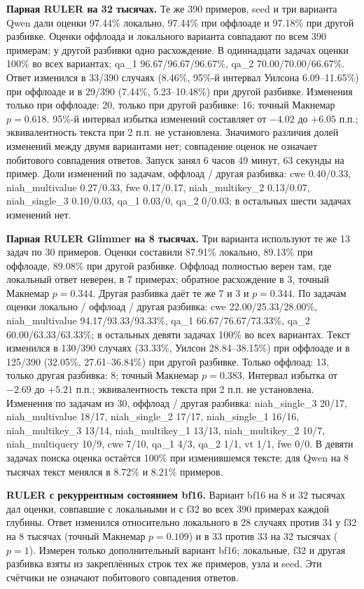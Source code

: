 \textbf{Парная RULER на 32 тысячах.} Те же 390 примеров, seed и три варианта Qwen дали оценки
97.44\% локально, 97.44\% при оффлоаде и 97.18\% при другой разбивке.
Оценки оффлоада и локального варианта совпадают по всем 390 примерам; у другой разбивки одно расхождение.
В одиннадцати задачах оценки 100\% во всех вариантах; qa\_1 96.67/96.67/96.67\%, qa\_2 70.00/70.00/66.67\%.
Ответ изменился в 33/390 случаях (8.46\%, 95\%-й интервал Уилсона 6.09--11.65\%) при оффлоаде
и в 29/390 (7.44\%, 5.23--10.48\%) при другой разбивке. Изменения только при оффлоаде: 20,
только при другой разбивке: 16; точный Макнемар $p=0.618$.
95\%-й интервал избытка изменений составляет от $-4.02$ до $+6.05$ п.п.; эквивалентность текста при 2 п.п. не установлена.
Значимого различия долей изменений между двумя вариантами нет; совпадение оценок не означает побитового совпадения ответов.
Запуск занял 6 часов 49 минут, 63 секунды на пример.
Доли изменений по задачам, оффлоад / другая разбивка: cwe 0.40/0.33, niah\_multivalue 0.27/0.33,
fwe 0.17/0.17, niah\_multikey\_2 0.13/0.07, niah\_single\_3 0.10/0.03,
qa\_1 0.03/0, qa\_2 0/0.03; в остальных шести задачах изменений нет.

\textbf{Парная RULER Glimmer на 8 тысячах.} Три варианта используют те же 13 задач по 30 примеров.
Оценки составили 87.91\% локально, 89.13\% при оффлоаде, 89.08\% при другой разбивке.
Оффлоад полностью верен там, где локальный ответ неверен, в 7 примерах; обратное расхождение в 3,
точный Макнемар $p=0.344$. Другая разбивка даёт те же 7 и 3 и $p=0.344$.
По задачам оценки локально / оффлоад / другая разбивка: cwe 22.00/25.33/28.00\%,
niah\_multivalue 94.17/93.33/93.33\%, qa\_1 66.67/76.67/73.33\%, qa\_2 60.00/63.33/63.33\%;
в остальных девяти задачах 100\% во всех вариантах.
Текст изменился в 130/390 случаях (33.33\%, Уилсон 28.84--38.15\%) при оффлоаде и в 125/390
(32.05\%, 27.61--36.84\%) при другой разбивке. Только оффлоад: 13, только другая разбивка: 8;
точный Макнемар $p=0.383$. Интервал избытка от $-2.69$ до $+5.21$ п.п.; эквивалентность текста при 2 п.п. не установлена.
Изменения по задачам из 30, оффлоад / другая разбивка:
niah\_single\_3 20/17, niah\_multivalue 18/17, niah\_single\_2 17/17, niah\_single\_1 16/16,
niah\_multikey\_3 13/14, niah\_multikey\_1 13/13, niah\_multikey\_2 10/7,
niah\_multiquery 10/9, cwe 7/10, qa\_1 4/3, qa\_2 1/1, vt 1/1, fwe 0/0.
В девяти задачах поиска оценка остаётся 100\% при изменившемся тексте; для Qwen на 8 тысячах текст менялся в 8.72\% и 8.21\% примеров.

\textbf{RULER с рекуррентным состоянием bf16.} Вариант bf16 на 8 и 32 тысячах
дал оценки, совпавшие с локальными и с f32 во всех 390 примерах каждой глубины.
Ответ изменился относительно локального в 28 случаях против 34 у f32 на 8 тысячах
(точный Макнемар $p=0.109$) и в 33 против 33 на 32 тысячах ($p=1$).
Измерен только дополнительный вариант bf16; локальные, f32 и другая разбивка взяты из закреплённых строк
тех же примеров, узла и seed. Эти счётчики не означают побитового совпадения ответов.

